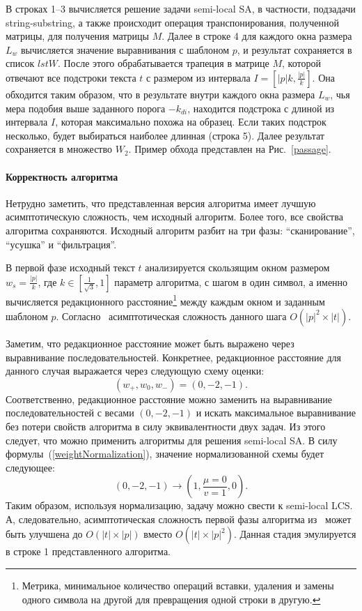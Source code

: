 В строках 1--3 вычисляется решение задачи semi-local SA, в частности, подзадачи string-substring, а также происходит операция транспонирования, полученной матрицы, для получения матрицы $M$.
Далее в строке 4 для каждого окна размера $L_{w}$ вычисляется значение выравнивания с шаблоном $p$, и результат сохраняется в список $lstW$.
После этого обрабатывается трапеция в матрице $M$, которой отвечают все подстроки текста $t$ с размером из интервала $I=[|p|k,\frac{|p|}{k}]$.
Она обходится таким образом, что в результате внутри каждого окна размера $L_{w}$, чья  мера подобия выше заданного порога $-k_{di}$, находится подстрока с длиной из интервала $I$, которая максимально похожа на образец.
Если таких подстрок несколько, будет выбираться наиболее длинная (строка 5).
Далее результат сохраняется в множество $W_{2}$.
Пример обхода представлен на Рис.~\ref{passage}.

\paragraph*{Корректность алгоритма}\mbox{}

Нетрудно заметить, что представленная версия алгоритма имеет лучшую асимптотическую сложность, чем исходный алгоритм.
Более того, все свойства алгоритма сохраняются.
Исходный алгоритм разбит на три фазы: ``сканирование'', ``усушка'' и ``фильтрация''.

В первой фазе исходный текст $t$ анализируется скользящим окном размером $w_{s} = \frac{|p|}{k}$, где $k \in [\frac{1}{\sqrt{3}},1]$ параметр алгоритма, с шагом в один символ, а именно вычисляется редакционного расстояние\footnote{Метрика, минимальное количество операций вставки, удаления и замены одного символа на другой для превращения одной строки в другую.} между каждым окном и заданным шаблоном $p$.
Согласно~\cite{luciv2019interactive} асимптотическая сложность данного шага $O(|p|^2 \times |t|)$.

Заметим, что редакционное расстояние может быть выражено через выравнивание последовательностей.
Конкретнее, редакционное расстояние для данного случая выражается через следующую схему оценки:
\begin{equation}\label{weightAppr}
    (w_{+},w_{0},w_{-}) = (0,-2,-1).
\end{equation}
Соответственно, редакционное расстояние можно заменить на выравнивание последовательностей с весами $(0,-2,-1)$ и искать максимальное выравнивание без потери свойств алгоритма в силу эквивалентности двух задач.
Из этого следует, что можно применить алгоритмы для решения semi-local SA.
В силу формулы~(\ref{weightNormalization}), значение нормализованной схемы будет следующее:
\begin{equation}
    (0, -2, -1) \rightarrow (1,\frac{\mu=0}{v=1}, 0).
\end{equation}
Таким образом, используя нормализацию, задачу можно свести к semi-local LCS.
А, следовательно, асимптотическая сложность первой фазы алгоритма из~\cite{luciv2019interactive} может быть улучшена до $O(|t| \times |p|)$ вместо $O(|t| \times |p|^2)$.
Данная стадия эмулируется в строке 1 представленного алгоритма.

